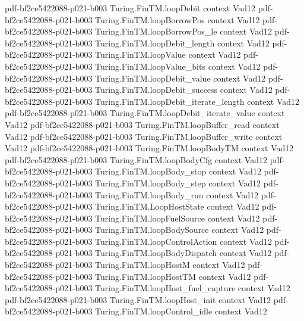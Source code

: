 \begin{theorem}
  {pdf-bf2ce5422088-p021-b003}
\proofstep
  {Turing.FinTM.loopDebit}
  {context}
  {Vad12}
  {pdf-bf2ce5422088-p021-b003}
\proofstep
  {Turing.FinTM.loopBorrowPos}
  {context}
  {Vad12}
  {pdf-bf2ce5422088-p021-b003}
\proofstep
  {Turing.FinTM.loopBorrowPos_le}
  {context}
  {Vad12}
  {pdf-bf2ce5422088-p021-b003}
\proofstep
  {Turing.FinTM.loopDebit_length}
  {context}
  {Vad12}
  {pdf-bf2ce5422088-p021-b003}
\proofstep
  {Turing.FinTM.loopValue}
  {context}
  {Vad12}
  {pdf-bf2ce5422088-p021-b003}
\proofstep
  {Turing.FinTM.loopValue_bits}
  {context}
  {Vad12}
  {pdf-bf2ce5422088-p021-b003}
\proofstep
  {Turing.FinTM.loopDebit_value}
  {context}
  {Vad12}
  {pdf-bf2ce5422088-p021-b003}
\proofstep
  {Turing.FinTM.loopDebit_success}
  {context}
  {Vad12}
  {pdf-bf2ce5422088-p021-b003}
\proofstep
  {Turing.FinTM.loopDebit_iterate_length}
  {context}
  {Vad12}
  {pdf-bf2ce5422088-p021-b003}
\proofstep
  {Turing.FinTM.loopDebit_iterate_value}
  {context}
  {Vad12}
  {pdf-bf2ce5422088-p021-b003}
\proofstep
  {Turing.FinTM.loopBuffer_read}
  {context}
  {Vad12}
  {pdf-bf2ce5422088-p021-b003}
\proofstep
  {Turing.FinTM.loopBuffer_write}
  {context}
  {Vad12}
  {pdf-bf2ce5422088-p021-b003}
\proofstep
  {Turing.FinTM.loopBodyTM}
  {context}
  {Vad12}
  {pdf-bf2ce5422088-p021-b003}
\proofstep
  {Turing.FinTM.loopBodyCfg}
  {context}
  {Vad12}
  {pdf-bf2ce5422088-p021-b003}
\proofstep
  {Turing.FinTM.loopBody_stop}
  {context}
  {Vad12}
  {pdf-bf2ce5422088-p021-b003}
\proofstep
  {Turing.FinTM.loopBody_step}
  {context}
  {Vad12}
  {pdf-bf2ce5422088-p021-b003}
\proofstep
  {Turing.FinTM.loopBody_run}
  {context}
  {Vad12}
  {pdf-bf2ce5422088-p021-b003}
\proofstep
  {Turing.FinTM.LoopHostState}
  {context}
  {Vad12}
  {pdf-bf2ce5422088-p021-b003}
\proofstep
  {Turing.FinTM.loopFuelSource}
  {context}
  {Vad12}
  {pdf-bf2ce5422088-p021-b003}
\proofstep
  {Turing.FinTM.loopBodySource}
  {context}
  {Vad12}
  {pdf-bf2ce5422088-p021-b003}
\proofstep
  {Turing.FinTM.loopControlAction}
  {context}
  {Vad12}
  {pdf-bf2ce5422088-p021-b003}
\proofstep
  {Turing.FinTM.loopBodyDispatch}
  {context}
  {Vad12}
  {pdf-bf2ce5422088-p021-b003}
\proofstep
  {Turing.FinTM.loopHostM}
  {context}
  {Vad12}
  {pdf-bf2ce5422088-p021-b003}
\proofstep
  {Turing.FinTM.loopHostTM}
  {context}
  {Vad12}
  {pdf-bf2ce5422088-p021-b003}
\proofstep
  {Turing.FinTM.loopHost_fuel_capture}
  {context}
  {Vad12}
  {pdf-bf2ce5422088-p021-b003}
\proofstep
  {Turing.FinTM.loopHost_init}
  {context}
  {Vad12}
  {pdf-bf2ce5422088-p021-b003}
\proofstep
  {Turing.FinTM.loopControl_idle}
  {context}
  {Vad12}

\end{theorem}
